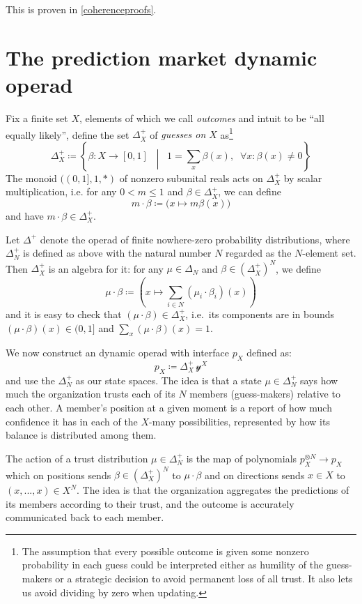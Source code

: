 \documentclass[11pt, one side, article]{memoir}
\theoremstyle{definition}
\theoremstyle{plain}
\newcommand{\yon}{\mathcal{y}}
\newcommand{\0}{\textsf{0}}
\newcommand{\1}{\tn{\textsf{1}}}
\newcommand{\bet}{\Delta^+}
\begin{document}
This is proven in \cref{coherenceproofs}.%


\section{The prediction market dynamic operad}\label{sec.kelley}


Fix a finite set $X$, elements of which we call \emph{outcomes} and intuit to be ``all equally likely'', define the set $\bet_X$ of \emph{guesses on $X$} as\footnote{The assumption that every possible outcome is given some nonzero probability in each guess could be interpreted either as humility of the guess-makers or a strategic decision to avoid permanent loss of all trust. It also lets us avoid dividing by zero when updating.}
\[
	\bet_X\coloneqq\left\{\beta\colon X\to[0,1]\;\;\middle|\;\;1=\sum_x\beta(x), \;\; \forall x\colon \beta(x) \neq 0 \right\}
\]
The monoid $((0,1],1,*)$ of nonzero subunital reals acts on $\bet_X$ by scalar multiplication, i.e. for any $0 < m\leq 1$ and $\beta\in\bet_X$, we can define
\[
	m\cdot \beta\coloneqq \big(x\mapsto m\beta (x)\big)
\]
and have $m\cdot\beta\in\bet_X$. 

Let $\Delta^+$ denote the operad of finite nowhere-zero probability distributions, where $\Delta^+_N$ is defined as above with the natural number $N$ regarded as the $N$-element set. %
Then $\bet_X$ is an algebra for it: for any $\mu\in\Delta_N$ and $\beta \in (\bet_X)^N$, we define 
\[
	\mu\cdot\beta\coloneqq\left(x\mapsto\sum_{i\in N}(\mu_i\cdot\beta_i)(x)\right)
\]
and it is easy to check that $(\mu\cdot\beta)\in\bet_X$, i.e.\ its components are in bounds $(\mu\cdot\beta)(x)\in (0,1]$ and $\sum_x(\mu\cdot\beta)(x)=1$.

We now construct an dynamic operad with interface $p_X$ defined as:
\[
p_X\coloneqq \bet_X\,\yon^X
\]
and use the $\Delta^+_N$ as our state spaces. The idea is that a state $\mu\in\Delta^+_N$ says how much the organization trusts each of its $N$ members (guess-makers) relative to each other. A member's position at a given moment is a report of how much confidence it has in each of the $X$-many possibilities, represented by how its balance is distributed among them.

The action of a trust distribution $\mu \in \Delta^+_N$ is the map of polynomials $p_X^{\otimes N} \to p_X$ which on positions sends $\beta \in (\bet_X)^N$ to $\mu \cdot \beta$ and on directions sends $x \in X$ to $(x,...,x) \in X^N$. The idea is that the organization aggregates the predictions of its members according to their trust, and the outcome is accurately communicated back to each member.
\end{document}
